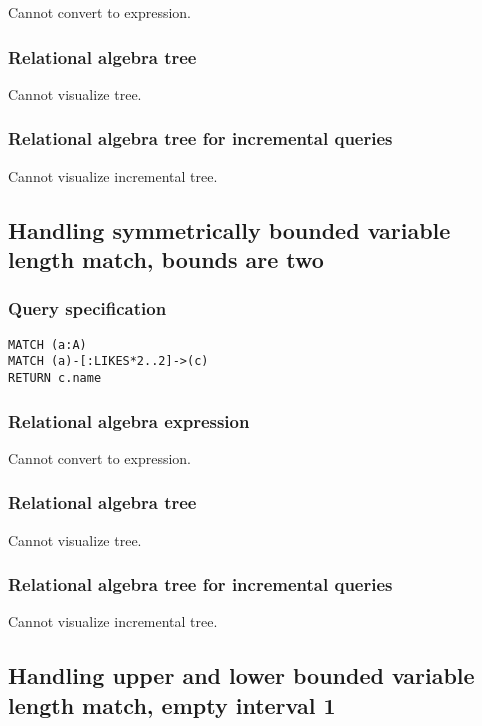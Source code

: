 Cannot convert to expression.

\subsubsection*{Relational algebra tree}

Cannot visualize tree.

\subsubsection*{Relational algebra tree for incremental queries}

Cannot visualize incremental tree.

\subsection{Handling symmetrically bounded variable length match, bounds are two}

\subsubsection*{Query specification}

\begin{lstlisting}
MATCH (a:A)
MATCH (a)-[:LIKES*2..2]->(c)
RETURN c.name
\end{lstlisting}

\subsubsection*{Relational algebra expression}

Cannot convert to expression.

\subsubsection*{Relational algebra tree}

Cannot visualize tree.

\subsubsection*{Relational algebra tree for incremental queries}

Cannot visualize incremental tree.

\subsection{Handling upper and lower bounded variable length match, empty interval 1}

